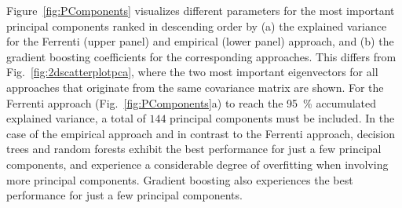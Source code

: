 \documentclass[superscriptaddress,
preprint,
 amsmath,amssymb,
 aps,
]{revtex4-2}
\newcommand{\mrk}[1]{\textcolor{red}{#1}}
\begin{document}
Figure~\ref{fig:PComponents} visualizes different parameters for the most important principal components ranked in descending order by (a) the explained variance for the Ferrenti (upper panel) and empirical (lower panel) approach, and (b) the gradient boosting coefficients for the corresponding approaches. This differs from Fig.~\ref{fig:2dscatterplotpca}, where the two most important eigenvectors for all approaches that originate from the same covariance matrix are shown. 
For the Ferrenti approach (Fig.~\ref{fig:PComponents}a) to reach the \SI{95}{\percent} accumulated explained variance, a total of $144$ principal components must be included. In the case of the empirical approach and in contrast to the Ferrenti approach, decision trees and random forests exhibit the best performance for just a few principal components, and experience a considerable degree of overfitting when involving more principal components. Gradient boosting 
also experiences the best performance for just a few principal components. 
\end{document}

